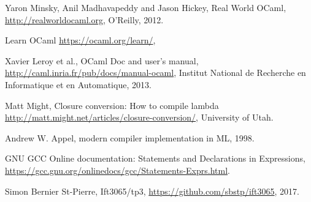 \documentclass{article}
\begin{document}
\begin{thebibliography}{9}

	Yaron Minsky, Anil Madhavapeddy and Jason Hickey,
	Real World OCaml,
	\url{http://realworldocaml.org},
	O'Reilly,
	2012.

	Learn OCaml
	\url{https://ocaml.org/learn/},

	Xavier Leroy et al.,
	OCaml Doc and user's manual,
	\url{http://caml.inria.fr/pub/docs/manual-ocaml},
	Institut National de Recherche en Informatique et en Automatique,
	2013.

	Matt Might,
  Closure conversion: How to compile lambda
	\url{http://matt.might.net/articles/closure-conversion/},
  University of Utah.
  
  Andrew W. Appel,
  modern compiler implementation in ML,
  1998.

  GNU GCC Online documentation: Statements and Declarations in Expressions,
	\url{https://gcc.gnu.org/onlinedocs/gcc/Statements-Exprs.html}.

  Simon Bernier St-Pierre,
  Ift3065/tp3,
	\url{https://github.com/sbstp/ift3065},
  2017.
  

\end{thebibliography}
\end{document}
